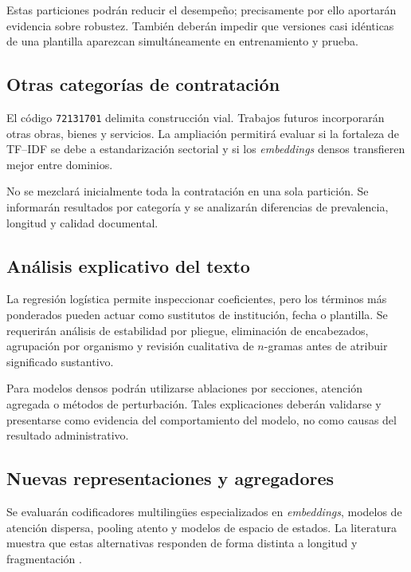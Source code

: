 Estas particiones podrán reducir el desempeño; precisamente por ello aportarán evidencia sobre robustez. También deberán impedir que versiones casi idénticas de una plantilla aparezcan simultáneamente en entrenamiento y prueba.

\subsection{Otras categorías de contratación}

El código \texttt{72131701} delimita construcción vial. Trabajos futuros incorporarán otras obras, bienes y servicios. La ampliación permitirá evaluar si la fortaleza de TF--IDF se debe a estandarización sectorial y si los \textit{embeddings} densos transfieren mejor entre dominios.

No se mezclará inicialmente toda la contratación en una sola partición. Se informarán resultados por categoría y se analizarán diferencias de prevalencia, longitud y calidad documental.

\subsection{Análisis explicativo del texto}

La regresión logística permite inspeccionar coeficientes, pero los términos más ponderados pueden actuar como sustitutos de institución, fecha o plantilla. Se requerirán análisis de estabilidad por pliegue, eliminación de encabezados, agrupación por organismo y revisión cualitativa de $n$-gramas antes de atribuir significado sustantivo.

Para modelos densos podrán utilizarse ablaciones por secciones, atención agregada o métodos de perturbación. Tales explicaciones deberán validarse y presentarse como evidencia del comportamiento del modelo, no como causas del resultado administrativo.

\subsection{Nuevas representaciones y agregadores}

Se evaluarán codificadores multilingües especializados en \textit{embeddings}, modelos de atención dispersa, pooling atento y modelos de espacio de estados. La literatura muestra que estas alternativas responden de forma distinta a longitud y fragmentación \parencite{beltagy2020longformer,dai2022revisiting,lu2023statespace}.

